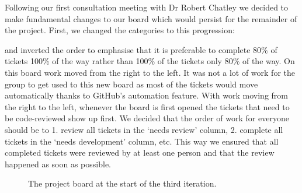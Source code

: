 Following our first consultation meeting with Dr Robert Chatley we decided to make fundamental changes to our board which would persist for the remainder of the project. First, we changed the categories to this progression:

\begin{figure}[H]
\centering
{}
\end{figure}

and inverted the order to emphasise that it is preferable to complete 80\% of tickets 100\% of the way rather than 100\% of the tickets only 80\% of the way. On this board work moved from the right to the left. It was not a lot of work for the group to get used to this new board as most of the tickets would move automatically thanks to GitHub's automation feature. With work moving from the right to the left, whenever the board is first opened the tickets that need to be code-reviewed show up first. We decided that the order of work for everyone should be to 1. review all tickets in the `needs review' column, 2. complete all tickets in the `needs development' column, etc. This way we ensured that all completed tickets were reviewed by at least one person and that the review happened as soon as possible.

\begin{figure}[H]
\centering
{}
\caption{The project board at the start of the third iteration.}
\label{board}
\end{figure}

